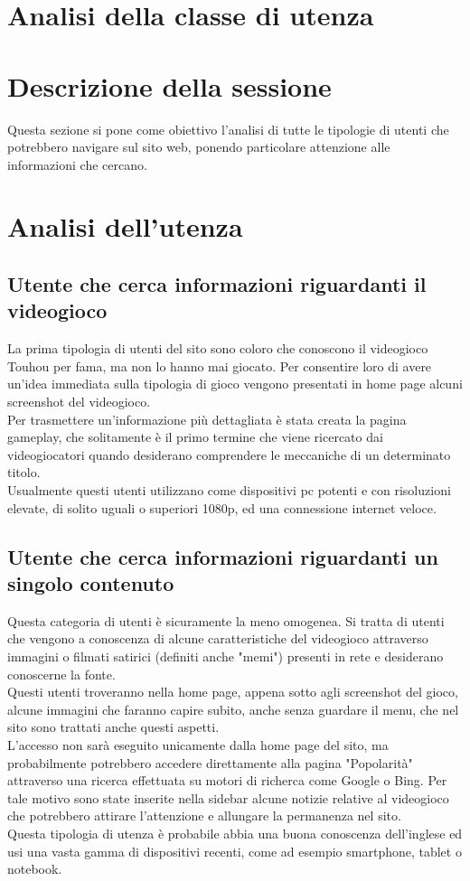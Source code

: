 \documentclass[openany, a4paper, 12pt]{report}
\begin{document}
	\section{Analisi della classe di utenza}

		\section{Descrizione della sessione}
		Questa sezione si pone come obiettivo l'analisi di tutte le tipologie di utenti che potrebbero navigare sul sito web, ponendo particolare attenzione alle informazioni che cercano.
		\section{Analisi dell'utenza}
		\subsection{Utente che cerca informazioni riguardanti il videogioco}
		La prima tipologia di utenti del sito sono coloro che conoscono il videogioco Touhou per fama, ma non lo hanno mai giocato. Per consentire loro di avere un'idea immediata sulla tipologia di gioco vengono presentati in home page alcuni screenshot del videogioco.\\
		Per trasmettere un'informazione più dettagliata è stata creata la pagina gameplay, che solitamente è il primo termine che viene ricercato dai videogiocatori quando desiderano comprendere le meccaniche di un determinato titolo.\\
		Usualmente questi utenti utilizzano come dispositivi pc potenti e con risoluzioni elevate, di solito uguali o superiori 1080p, ed una connessione internet veloce.
		\subsection{Utente che cerca informazioni riguardanti un singolo contenuto}
		Questa categoria di utenti è sicuramente la meno omogenea. Si tratta di utenti che vengono a conoscenza di alcune caratteristiche del videogioco attraverso immagini o filmati satirici (definiti anche "memi") presenti in rete e desiderano conoscerne la fonte.\\
		Questi utenti troveranno nella home page, appena sotto agli screenshot del gioco, alcune immagini che faranno capire subito, anche senza guardare il menu, che nel sito sono trattati anche questi aspetti.\\
		L'accesso non sarà eseguito unicamente dalla home page del sito, ma probabilmente potrebbero accedere direttamente alla pagina "Popolarità" attraverso una ricerca effettuata su motori di richerca come Google o Bing. Per tale motivo sono state inserite nella sidebar alcune notizie relative al videogioco che potrebbero attirare l'attenzione e allungare la permanenza nel sito.\\
		Questa tipologia di utenza è probabile abbia una buona conoscenza dell'inglese ed usi una vasta gamma di dispositivi recenti, come ad esempio smartphone, tablet o notebook.\\
\end{document}
